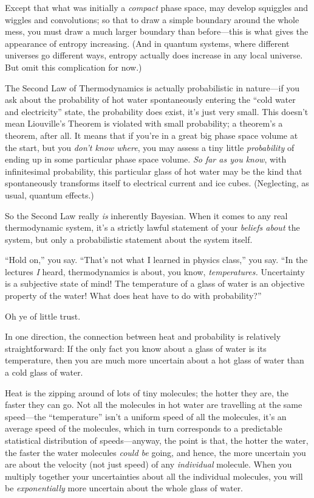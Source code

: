 {
 Except that what was initially a \textit{compact} phase space, may
develop squiggles and wiggles and convolutions; so that to draw a
simple boundary around the whole mess, you must draw a much larger
boundary than before---this is what gives the appearance of entropy
increasing. (And in quantum systems, where different universes go
different ways, entropy actually does increase in any local universe.
But omit this complication for now.)}

{
 The Second Law of Thermodynamics is actually probabilistic in
nature---if you ask about the probability of hot water spontaneously
entering the ``cold water and
electricity'' state, the probability does exist,
it's just very small. This doesn't mean
Liouville's Theorem is violated with small probability;
a theorem's a theorem, after all. It means that if
you're in a great big phase space volume at the start,
but you \textit{don't know where}, you may assess a
tiny little \textit{probability} of ending up in some particular phase
space volume. \textit{So far as you know}, with infinitesimal
probability, this particular glass of hot water may be the kind that
spontaneously transforms itself to electrical current and ice cubes.
(Neglecting, as usual, quantum effects.)}

{
 So the Second Law really \textit{is} inherently Bayesian. When it
comes to any real thermodynamic system, it's a strictly
lawful statement of your \textit{beliefs about} the system, but only a
probabilistic statement about the system itself.}

{
 ``Hold on,'' you say.
``That's not what I learned in physics
class,'' you say. ``In the lectures
\textit{I} heard, thermodynamics is about, you know,
\textit{temperatures.} Uncertainty is a subjective state of mind! The
temperature of a glass of water is an objective property of the water!
What does heat have to do with probability?''}

{
 Oh ye of little trust.}

{
 In one direction, the connection between heat and probability is
relatively straightforward: If the only fact you know about a glass of
water is its temperature, then you are much more uncertain about a hot
glass of water than a cold glass of water.}

{
 Heat is the zipping around of lots of tiny molecules; the hotter
they are, the faster they can go. Not all the molecules in hot water
are travelling at the same speed---the
``temperature''
isn't a uniform speed of all the molecules,
it's an average speed of the molecules, which in turn
corresponds to a predictable statistical distribution of
speeds---anyway, the point is that, the hotter the water, the faster
the water molecules \textit{could be} going, and hence, the more
uncertain you are about the velocity (not just speed) of any
\textit{individual} molecule. When you multiply together your
uncertainties about all the individual molecules, you will be
\textit{exponentially} more uncertain about the whole glass of water.}

